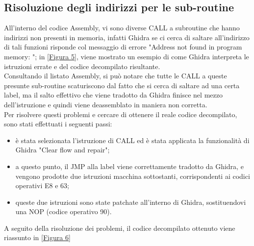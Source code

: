\documentclass[12pt]{extarticle}
\begin{document}
\subsection{Risoluzione degli indirizzi per le sub-routine}
All'interno del codice Assembly, vi sono diverse CALL a subroutine che hanno indirizzi non presenti in memoria, infatti Ghidra se ci cerca di saltare all'indirizzo di tali funzioni risponde col messaggio di errore "Address not found in program memory: "; in \ref{Figura 5}, viene mostrato un esempio di come Ghidra interpreta le istruzioni errate e del codice decompilato risultante.\\Consultando il listato Assembly, si può notare che tutte le CALL a queste presunte sub-routine scaturiscono dal fatto che si cerca di saltare ad una certa label, ma il salto effettivo che viene tradotto da Ghidra finisce nel mezzo dell'istruzione e quindi viene deassemblato in maniera non corretta.\\Per risolvere questi problemi e cercare di ottenere il reale codice decompilato, sono stati effettuati i seguenti passi:
\begin{itemize}
\item è stata selezionata l'istruzione di CALL ed è stata applicata la funzionalità di Ghidra "Clear flow and repair";
\item a questo punto, il JMP alla label viene correttamente tradotto da Ghidra, e vengono prodotte due istruzioni macchina sottostanti, corrispondenti ai codici operativi E8 e 63;
\item queste due istruzioni sono state patchate all'interno di Ghidra, sostituendovi una NOP (codice operativo 90).
\end{itemize}
A seguito della risoluzione dei problemi, il codice decompilato ottenuto viene riassunto in \ref{Figura 6}
\end{document}

